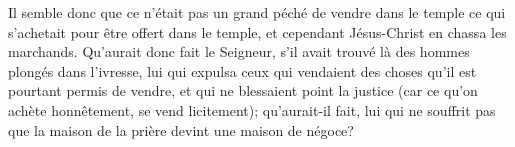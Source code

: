 Il semble donc que ce n’était pas un grand péché
	de vendre dans le temple ce qui s’achetait pour être offert dans le temple,
	et cependant Jésus-Christ en chassa les marchands.
Qu’aurait donc fait le Seigneur,
	s’il avait trouvé là des hommes plongés dans l’ivresse,
	lui qui expulsa ceux qui vendaient des choses
		qu’il est pourtant permis de vendre,
	et qui ne blessaient point la justice
		(car ce qu’on achète honnêtement, se vend licitement);
	qu’aurait-il fait, lui qui ne souffrit pas
		que la maison de la prière devint une maison de négoce?

